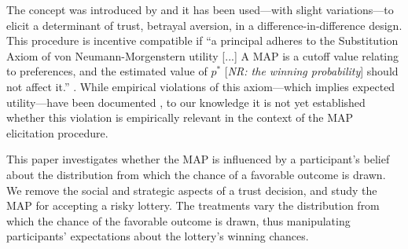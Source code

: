 The concept was introduced by \cite{Bohnet2004} and it has been used—with slight variations—to elicit a determinant of trust, betrayal aversion, in a difference-in-difference design.
This procedure is incentive compatible if ``a principal adheres to the Substitution Axiom of von Neumann-Morgenstern utility [...] A MAP is a cutoff value relating to preferences, and the estimated value of $p^*$ [\textit{NR: the winning probability}] should not affect it.'' \citep[p. 298]{Bohnet2008}.
While empirical violations of this axiom---which implies expected utility---have been documented \cite[see footnote 5 on p. 275 in][for a list of studies finding empirical violations]{Li2020a}, to our knowledge it is not yet established whether this violation is empirically relevant in the context of the MAP elicitation procedure.%


This paper investigates whether the MAP is influenced by a participant’s belief about the distribution from which the chance of a favorable outcome is drawn. 
We remove the social and strategic aspects of a trust decision, and study the MAP for accepting a risky lottery.
The treatments vary the distribution from which the chance of the favorable outcome is drawn, thus manipulating participants’ expectations about the lottery’s winning chances.

